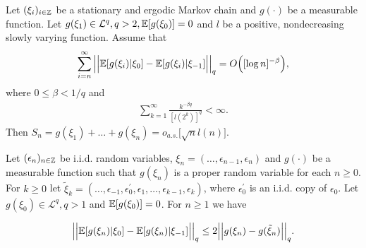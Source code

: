 \documentclass[a4paper,12pt]{article}
\begin{document}
\begin{theoremA}{\cite{Wu2007}}\label{theo-wu-2}
Let $(\xi_i)_{i \in \mathbb{Z}}$ be a stationary and ergodic Markov chain and $g(\cdot)$ be a measurable function. Let $g(\xi_1) \in \mathcal{L}^q, q > 2, \mathbb{E}[g(\xi_0)] = 0$ and $\mathit{l}$ be a positive, nondecreasing slowly varying function. Assume that $$ \sum_{i = n}^\infty \Big|\Big| \mathbb{E} [g(\xi_i)| \xi_0] - \mathbb{E} [g(\xi_i)| \xi_{-1}]\Big|\Big|_q =O\Big([\log n]^{-\beta}\Big),$$ where $0 \leq \beta<1/q$ and 
\begin{align*}
\sum_{k=1}^\infty \frac{k^{-\beta q}}{[l(2^k)]^q} < \infty.	
\end{align*}
Then $S_n = g(\xi_1) + \ldots + g(\xi_n) = o_{a.s.}\big[\sqrt{n}l(n)\big]$.
\end{theoremA}

\begin{propA}{\cite{Wu2007}}\label{prop-wu}
Let $(\epsilon_n)_{n\in\mathbb{Z}}$ be i.i.d. random variables, $\xi_n = (\ldots, \epsilon_{n-1}, \epsilon_n)$ and $g(\cdot)$ be a measurable function such that $g(\xi_n)$ is a proper random variable for each $n \geq 0$. For $k \geq 0$ let $\tilde{\xi}_k = (\ldots, \epsilon_{-1}, \epsilon_0^\prime, \epsilon_1, \ldots, \epsilon_{k-1}, \epsilon_k)$, where $\epsilon_0^\prime$ is an i.i.d. copy of $\epsilon_0$. Let $g(\xi_0) \in \mathcal{L}^q, q > 1$ and $\mathbb{E}[g(\xi_0)] = 0$. For $n \geq 1$ we have

$$\Big|\Big| \mathbb{E} [g(\xi_n)| \xi_0] - \mathbb{E} [g(\xi_n)| \xi_{-1}]\Big|\Big|_q \leq 2 \Big|\Big| g(\xi_n) - g(\tilde{\xi}_n)\Big|\Big|_q.$$
\end{propA}
\end{document}

